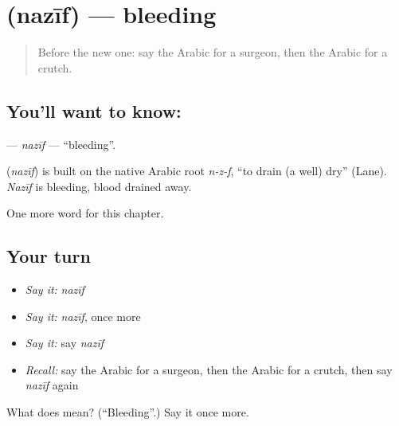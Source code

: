 \section[\texorpdfstring{\ar{نزيف} (nazīf)}{نزيف (nazīf)}]{ (nazīf) — bleeding}

\label{lesson:AR-C232-nazif}



\begin{quote}
Before the new one: say the Arabic for a surgeon, then the Arabic for a crutch.
\end{quote}

\subsection*{You'll want to know: }
\textbf{} — \emph{nazīf} — \textquotedblleft{}bleeding\textquotedblright{}.

\begin{cousinweb}
\textbf{} (\emph{nazīf}) is built on the native Arabic root \emph{n-z-f}, \textquotedblleft{}to drain (a well) dry\textquotedblright{} (Lane). \emph{Nazīf} is bleeding, blood drained away.
\end{cousinweb}

\begin{grammarlens}[title={What you've built}]
One more word for this chapter.
\end{grammarlens}

\subsection*{Your turn}
\begin{itemize}
\raggedright
  \item \emph{Say it:} \emph{nazīf}
  \item \emph{Say it:} \emph{nazīf}, once more
  \item \emph{Say it:} say \emph{nazīf}
  \item \emph{Recall:} say the Arabic for a surgeon, then the Arabic for a crutch, then say \emph{nazīf} again
\end{itemize}

\begin{tcolorbox}[breakable,colback=teal!4,colframe=teal!35!black,title={Before you move on}]
What does  mean? (\textquotedblleft{}Bleeding\textquotedblright{}.) Say it once more.
\end{tcolorbox}
